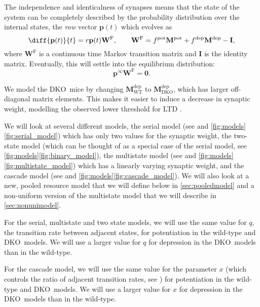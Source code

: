 \documentclass[10pt]{article}
\newcommand{\I}{\mathbf{I}}
\newcommand{\pr}{\mathbf{p}}
\newcommand{\eq}{\pr^\infty}
\newcommand{\w}{\mathbf{w}}
\newcommand{\W}{\mathbf{W}}
\newcommand{\frg}{\W^\mathrm{F}}
\newcommand{\M}{\mathbf{M}}
\newcommand{\pot}{^{\text{pot}}}
\newcommand{\dep}{^{\text{dep}}}
\newcommand{\wt}{_{\text{WT}}}
\newcommand{\ko}{_{\text{\KO}}}
\newcommand{\KO}{DKO}
\begin{document}
The independence and identicalness of synapses means that the state of the system can be completely described by the probability distribution over the internal states, the \emph{row} vector $\pr(t)$ which evolves as
%
\begin{equation}\label{eq:evolve}
  \diff{\pr(t)}{t} = r\pr(t)\frg,
  \qquad
  \frg = f\pot\M\pot+f\dep\M\dep-\I,
\end{equation}
%
where $\frg$ is a continuous time Markov transition matrix and $\I$ is the identity matrix.
Eventually, this will settle into the equilibrium distribution:
%
\begin{equation}\label{eq:eqprob}
  \eq\frg = \mathbf{0}.
\end{equation}
%


We model the \KO\ mice by changing $\M\dep\wt$ to $\M\dep\ko$, which has larger off-diagonal matrix elements.
This makes it easier to induce a decrease in synaptic weight, modelling the observed lower threshold for LTD \cite{McConnell2009MHCcerebellum}.

We will look at several different models,
the serial model (see \cite{Leibold2008serial,Ben-DayanRubin2007sparse} and \autoref{fig:models}\ref{fig:serial_model}) which has only two values for the synaptic weight,
the two-state model (which can be thought of as a special case of the serial model, see \autoref{fig:models}\ref{fig:binary_model}),
the multistate model (see \cite{amit1994learning,Fusi2007multistate} and \autoref{fig:models}\ref{fig:multistate_model}) which has a linearly varying synaptic weight,
and the cascade model (see \cite{Fusi2005cascade} and \autoref{fig:models}\ref{fig:cascade_model}).
We will also look at a new, pooled resource model that we will define below in \autoref{sec:pooledmodel} and a non-uniform version of the multistate model that we will describe in \autoref{sec:nonunimodel}.

For the serial, multistate and two state models, we will use the same value for $q$, the transition rate between adjacent states, for potentiation in the wild-type and \KO\ models.
We will use a larger value for $q$ for depression in the \KO\ models than in the wild-type.

For the cascade model, we will use the same value for the parameter $x$ (which controls the ratio of adjacent transition rates, see \cite{Fusi2005cascade}) for potentiation in the wild-type and \KO\ models.
We will use a larger value for $x$ for depression in the \KO\ models than in the wild-type.
\end{document}
